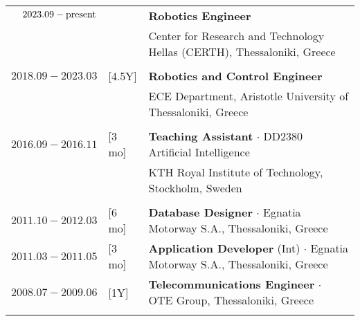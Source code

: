 \documentclass[a4paper,10pt,twoside]{article}
\begin{document}
\begin{tabular}{rlp{12cm}}
$2023.09 - \hfill \textnormal{present} \hfill$ & & \textbf{Robotics Engineer} \\
                                               & & Center for Research and Technology Hellas (CERTH), Thessaloniki, Greece\\
&\\
  $2018.09 - 2023.03$ & \hspace{-0.4cm} [4.5Y] & \textbf{Robotics and Control Engineer} \\
                      & \hspace{-0.4cm}        & ECE Department, Aristotle University of Thessaloniki, Greece\\
&\\
$2016.09 - 2016.11$   & \hspace{-0.4cm} [3 mo] & \textbf{Teaching Assistant} $\cdot$ DD2380 Artificial Intelligence\\
                      & \hspace{-0.4cm}        & KTH Royal Institute of Technology, Stockholm, Sweden\\
&\\
$2011.10 - 2012.03$   & \hspace{-0.4cm} [6 mo]& \textbf{Database Designer} $\cdot$ Egnatia Motorway S.A., Thessaloniki, Greece\\
$2011.03 - 2011.05$   & \hspace{-0.4cm} [3 mo]& \textbf{Application Developer} (Int) $\cdot$ Egnatia Motorway S.A., Thessaloniki, Greece\\
$2008.07 - 2009.06$   & \hspace{-0.4cm} [1Y] & \textbf{Telecommunications Engineer} $\cdot$ OTE Group, Thessaloniki, Greece\\
&\\
\end{tabular}


\end{document}
